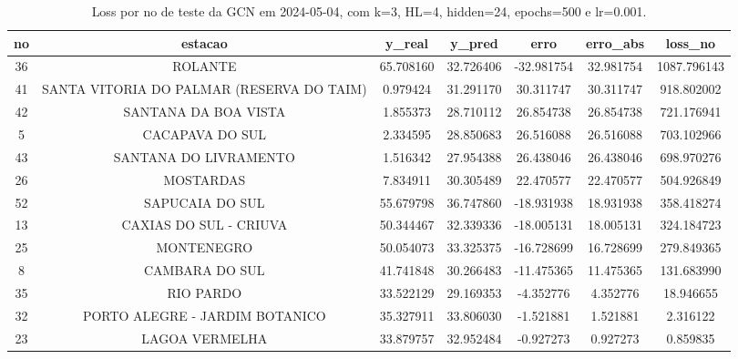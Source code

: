 \begin{table}[h]
\centering
\caption{Loss por no de teste da GCN em 2024-05-04, com k=3, HL=4, hidden=24, epochs=500 e lr=0.001.}
\label{tab:gcn_loss_k3_hl4_h24_e500_d20240504}
\begin{tabular}{ccccccc}
\toprule
no & estacao & y\_real & y\_pred & erro & erro\_abs & loss\_no \\
\midrule
36 & ROLANTE & 65.708160 & 32.726406 & -32.981754 & 32.981754 & 1087.796143 \\
41 & SANTA VITORIA DO PALMAR (RESERVA DO TAIM) & 0.979424 & 31.291170 & 30.311747 & 30.311747 & 918.802002 \\
42 & SANTANA DA BOA VISTA & 1.855373 & 28.710112 & 26.854738 & 26.854738 & 721.176941 \\
5 & CACAPAVA DO SUL & 2.334595 & 28.850683 & 26.516088 & 26.516088 & 703.102966 \\
43 & SANTANA DO LIVRAMENTO & 1.516342 & 27.954388 & 26.438046 & 26.438046 & 698.970276 \\
26 & MOSTARDAS & 7.834911 & 30.305489 & 22.470577 & 22.470577 & 504.926849 \\
52 & SAPUCAIA DO SUL & 55.679798 & 36.747860 & -18.931938 & 18.931938 & 358.418274 \\
13 & CAXIAS DO SUL - CRIUVA & 50.344467 & 32.339336 & -18.005131 & 18.005131 & 324.184723 \\
25 & MONTENEGRO & 50.054073 & 33.325375 & -16.728699 & 16.728699 & 279.849365 \\
8 & CAMBARA DO SUL & 41.741848 & 30.266483 & -11.475365 & 11.475365 & 131.683990 \\
35 & RIO PARDO & 33.522129 & 29.169353 & -4.352776 & 4.352776 & 18.946655 \\
32 & PORTO ALEGRE - JARDIM BOTANICO & 35.327911 & 33.806030 & -1.521881 & 1.521881 & 2.316122 \\
23 & LAGOA VERMELHA & 33.879757 & 32.952484 & -0.927273 & 0.927273 & 0.859835 \\
\bottomrule
\end{tabular}
\end{table}
